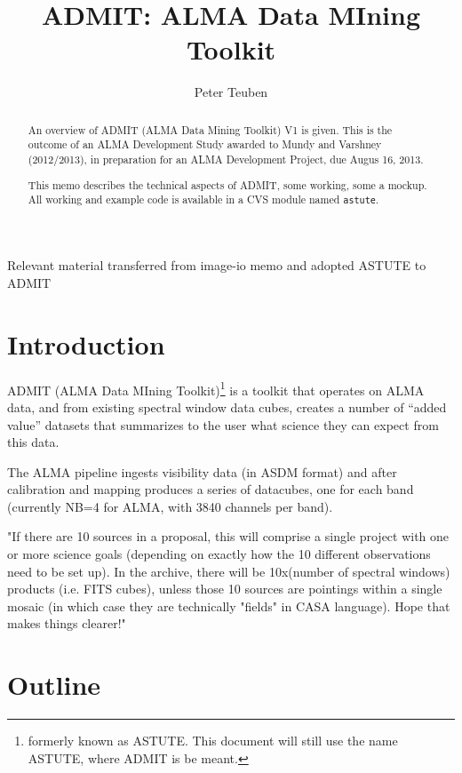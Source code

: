 \documentclass[preprint]{aastex} %
\begin{document}

\title{ADMIT: ALMA Data MIning Toolkit}

\author{Peter Teuben}

\begin{abstract}

An overview of ADMIT (ALMA Data Mining Toolkit) V1
is given. This is the outcome of an ALMA Development
Study awarded to Mundy and Varshney (2012/2013), in
preparation for an ALMA Development Project, due
Augus 16, 2013.

This memo describes the technical aspects of ADMIT, some
working, some a mockup. All working and example code
is available in a CVS module named {\tt astute}.

\end{abstract}


\ChangeRecordBegin
{}
{Relevant material transferred from image-io memo and adopted ASTUTE to ADMIT}
\ChangeRecordEnd


\section{Introduction}

ADMIT (ALMA Data MIning Toolkit)\footnote{formerly known as ASTUTE. 
This document will still use the name ASTUTE, where ADMIT is be meant.}
is a toolkit that operates on ALMA data, and from existing spectral window data cubes, 
creates a number of ``added value'' datasets that summarizes to the user
what science they can expect from this data.

The ALMA pipeline ingests visibility data (in ASDM format) and after calibration
and mapping produces a series of datacubes, one for each band (currently 
NB=4 for ALMA, with 3840 channels per band). 




"If there are 10 sources in a proposal, this will comprise a single
project with one or more science goals (depending on exactly how the
10 different observations need to be set up). In the archive, there
will be 10x(number of spectral windows) products (i.e. FITS cubes),
unless those 10 sources are pointings within a single mosaic (in which
case they are technically "fields" in CASA language). Hope that makes
things clearer!"


\section{Outline}
\end{document}
